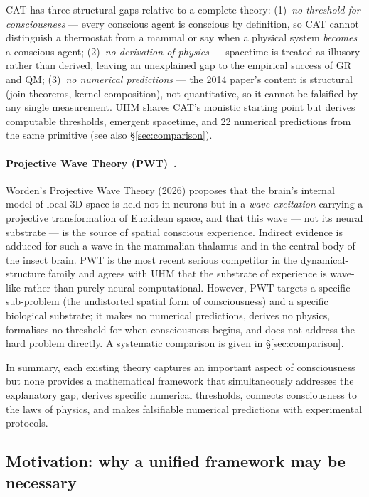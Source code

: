 CAT has three structural gaps relative to a complete theory:
(1)~\emph{no threshold for consciousness} --- every conscious agent is
conscious by definition, so CAT cannot distinguish a thermostat from a mammal
or say when a physical system \emph{becomes} a conscious agent;
(2)~\emph{no derivation of physics} --- spacetime is treated as illusory rather
than derived, leaving an unexplained gap to the empirical success of GR and QM;
(3)~\emph{no numerical predictions} --- the 2014 paper's content is structural
(join theorems, kernel composition), not quantitative, so it cannot be
falsified by any single measurement. UHM shares CAT's monistic starting point
but derives computable thresholds, emergent spacetime, and 22 numerical
predictions from the same primitive (see also \S\ref{sec:comparison}).

\paragraph{Projective Wave Theory (PWT)~\cite{worden2026}.}
Worden's Projective Wave Theory (2026) proposes that the brain's internal
model of local 3D space is held not in neurons but in a \emph{wave
excitation} carrying a projective transformation of Euclidean space, and that
this wave --- not its neural substrate --- is the source of spatial
conscious experience. Indirect evidence is adduced for such a wave in the
mammalian thalamus and in the central body of the insect brain. PWT is the
most recent serious competitor in the dynamical-structure family and agrees
with UHM that the substrate of experience is wave-like rather than
purely neural-computational. However, PWT targets a specific sub-problem
(the undistorted spatial form of consciousness) and a specific biological
substrate; it makes no numerical predictions, derives no physics,
formalises no threshold for when consciousness begins, and does not address
the hard problem directly. A systematic comparison is given in
\S\ref{sec:comparison}.

\medskip
In summary, each existing theory captures an important aspect of consciousness but none
provides a mathematical framework that simultaneously addresses the explanatory gap,
derives specific numerical thresholds, connects consciousness to the laws of physics,
and makes falsifiable numerical predictions with experimental protocols.

\subsection{Motivation: why a unified framework may be necessary}


